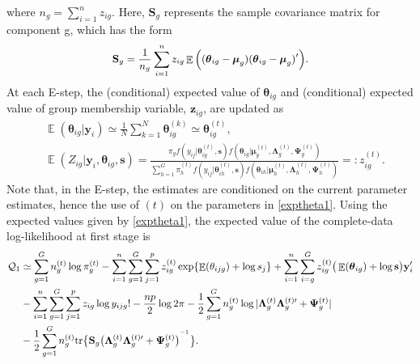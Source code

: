 \documentclass[12pt]{article}
\newcommand{\inv}{^{\raisebox{.2ex}{$\scriptscriptstyle-1$}}}
\DeclareMathOperator{\E}{\mathbb{E}}
\begin{document}
where $n_g = \sum_{i=1}^n z_{ig}$. Here, $\mathbf{S}_g$ represents the sample covariance matrix for component g, which has the form
\begin{equation*}
\label{sample_covariance_matrix}
     \small \mathbf{S}_g  = \frac{1}{n_g}\sum_{i=1}^n z_{ig} \E \Big((\boldsymbol{\theta}_{ig} - \boldsymbol{\mu}_g) (\boldsymbol{\theta}_{ig} - \boldsymbol{\mu}_g)^{\prime}\Big).
\end{equation*}
At each E-step, the (conditional) expected value of $\boldsymbol{\theta}_{ig}$ and (conditional) expected value of group membership variable, $\mathbf{z}_{ig}$, are updated as
\begin{equation}
\label{exptheta1}
\begin{split}
& \E( \boldsymbol{\theta}_{ig} |\textbf{y}_i) \simeq \frac{1} {N}\sum_{k=1}^N \boldsymbol{\theta}_{ig}^{(k)}  \simeq \boldsymbol{\theta}^{(t)}_{ig}, \\
& \E(Z_{ig} |\textbf{y}_i, \boldsymbol{\theta}_{ig}, \mathbf{s}) = \frac{\pi_g f(y_{ij}| \boldsymbol{\theta}_{ig}^{(t)}, \mathbf{s})  f(\boldsymbol{\theta}_{ig}|\boldsymbol{\mu}_g^{(t)},\mathbf{\Lambda}_g^{(t)}, \mathbf{\Psi}_g^{(t)})}{\sum_{h=1}^G \pi_h^{(t)} f(y_{ij}|\boldsymbol{\theta}_{ih}^{(t)}, \mathbf{s})  f(\boldsymbol{\theta}_{ih}| \boldsymbol{\mu}_h^{(t)},\mathbf{\Lambda}_h^{(t)}, \mathbf{\Psi}_h^{(t)})} =: z_{ig}^{(t)}.
\end{split}
\end{equation}
Note that, in the E-step, the estimates are conditioned on the current parameter estimates, hence the use of $(t)$ on the parameters in \eqref{exptheta1}. Using the expected values given by \eqref{exptheta1}, the expected value of the complete-data log-likelihood at first stage is
\begin{equation*} 
\begin{split}
\mathcal{Q}_1 & \simeq \sum_{g=1}^G n_g^{(t)} \log \pi_g^{(t)} - \sum_{i=1}^n \sum_{g=1}^G \sum_{j=1}^p z_{ig}^{(t)} \exp\{\E(\theta_{ijg}) + \log s_j\} + \sum_{i=1}^n \sum_{i=g}^G z_{ig}^{(t)} \big(\E(\boldsymbol{\theta}_{ig}) + \log \mathbf{s}\big) \mathbf{y}_i^{\prime} \\
& - \sum_{i=1}^n \sum_{g=1}^G \sum_{j=1}^p z_{ig} \log y_{ijg}! - \frac{np}{2} \log 2 \pi - \frac{1}{2} \sum_{g=1}^G n_g^{(t)} \log | \mathbf{\Lambda}_g^{(t)} \mathbf{\Lambda}_g^{(t) \prime} + \mathbf{\Psi}_g^{(t)} | \\
& - \frac{1}{2} \sum_{g=1}^G n_g^{(t)} \text{tr} \big\{ \mathbf{S}_g \big( \mathbf{\Lambda}_g^{(t)} \mathbf{\Lambda}_g^{(t) \prime} + \mathbf{\Psi}_g^{(t)} \big)^{\inv} \big\}.
\end{split}
\end{equation*}
\end{document}
